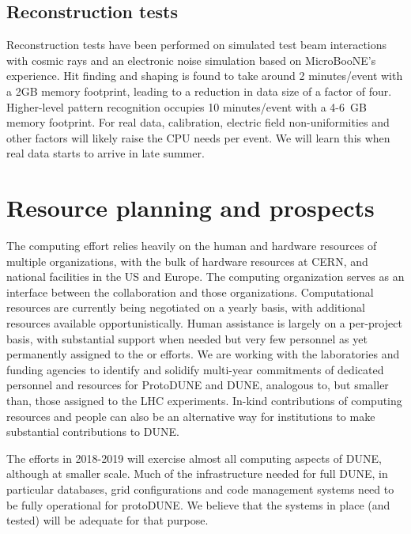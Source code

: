 \subsection{Reconstruction tests}
Reconstruction tests have been performed on simulated test beam interactions with cosmic rays and an electronic noise simulation based on MicroBooNE's experience.  Hit finding and shaping is found to take around 2 minutes/event with a 2GB memory footprint, leading to a reduction in data size of a factor of four.  Higher-level pattern recognition occupies 10 minutes/event with a 4-6~GB memory footprint. For real data, calibration, electric field non-uniformities and other factors will likely raise the CPU needs per event. We will learn this when real data starts to arrive in late summer. 


\section{Resource planning and prospects}



The   computing effort  relies heavily on the human and hardware resources of  multiple organizations,  with the bulk of hardware resources at CERN, and national facilities in the US and Europe.  The    computing organization serves as an interface between the collaboration and those organizations.  Computational resources are currently being negotiated on a yearly basis, with additional resources available opportunistically. Human assistance is largely on a per-project  basis, with substantial support when needed but very few personnel as yet permanently assigned to the   or  efforts.  We are working with the laboratories and funding agencies to identify and solidify multi-year commitments of dedicated personnel and resources for ProtoDUNE and DUNE, analogous to, but smaller than, those assigned to the LHC experiments.   In-kind contributions of computing resources and people can also  be an alternative way for institutions to make substantial contributions to DUNE.

The  efforts in 2018-2019 will exercise almost all computing aspects of DUNE, although at smaller scale.  Much of the infrastructure needed for full DUNE, in particular  databases, grid configurations and code management systems need to be fully operational  for protoDUNE.   We believe that the systems in place (and tested) will be adequate for that purpose.

